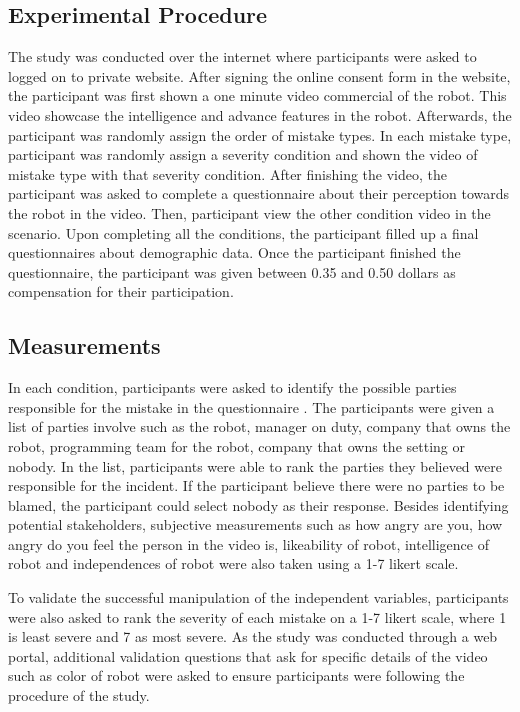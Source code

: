 \documentclass{sigchi}
\begin{document}
\subsection{Experimental Procedure}
The study was conducted over the internet where participants were asked to logged on to private website. After signing the online consent form in the website, the participant was first shown a one minute video commercial of the robot. This video showcase the intelligence and advance features in the robot. Afterwards, the participant was randomly assign the order of mistake types. In each mistake type, participant was randomly assign a severity condition and shown the video of mistake type with that severity condition. After finishing the video, the participant was asked to complete a questionnaire about their perception towards the robot in the video. Then, participant view the other condition video in the scenario. Upon completing all the conditions, the participant filled up a final questionnaires about demographic data. Once the participant finished the questionnaire, the participant was given between 0.35 and 0.50 dollars as compensation for their participation.

\subsection{Measurements}
In each condition, participants were asked to identify the possible parties responsible for the mistake in the questionnaire . The participants were given a list of parties involve such as the robot, manager on duty, company that owns the robot, programming team for the robot, company that owns the setting or nobody. In the list, participants were able to rank the parties they believed were responsible for the incident. If the participant believe there were no parties to be blamed, the participant could select nobody as their response. Besides identifying potential stakeholders, subjective measurements such as how angry are you, how angry do you feel the person in the video is, likeability of robot, intelligence of robot and independences of robot were also taken using a 1-7 likert scale.

To validate the successful manipulation of the independent variables, participants were also asked to rank the severity of each mistake on a 1-7 likert scale, where 1 is least severe and 7 as most severe. As the study was conducted through a web portal, additional validation questions that ask for specific details of the video such as color of robot were asked to ensure participants were following the procedure of the study.
\end{document}

